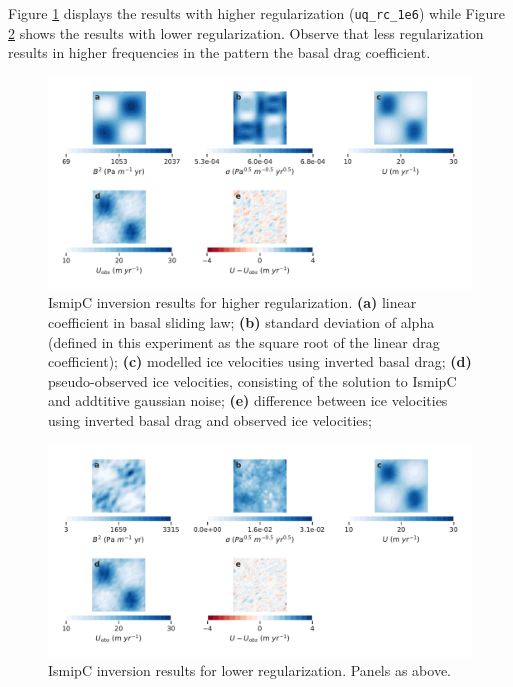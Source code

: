 \documentclass[11pt, reqno, nocenter]{article}
\begin{document}
Figure \ref{fig:inv_results_rc1e6} displays the results with higher regularization ({\tt uq\_rc\_1e6}) while Figure \ref{fig:inv_results_rc1e4} shows the results with lower regularization. Observe that less regularization results in higher frequencies in the pattern the basal drag coefficient.

\begin{figure}[!htbp]
  \centering
  \includegraphics[width=13cm]{./figures/inv_results_rc1e6.pdf}
  \caption[IsmipC Inversion Results for High Regularization.]{IsmipC inversion results for higher regularization. \textbf{(a)} linear coefficient in basal sliding law;  \textbf{(b)} standard deviation of alpha (defined in this experiment as the square root of the linear drag coefficient);   \textbf{(c)} modelled ice velocities using inverted basal drag;  \textbf{(d)} pseudo-observed ice velocities, consisting of the solution to IsmipC and addtitive gaussian noise;  \textbf{(e)} difference between ice velocities using inverted basal drag and observed ice velocities; }
      \label{fig:inv_results_rc1e6}
\end{figure}

\begin{figure}[!htbp]
  \centering
  \includegraphics[width=13cm]{./figures/inv_results_rc1e4.pdf}
  \caption[IsmipC Inversion Results for Low Regularization.]{IsmipC inversion results for lower regularization. Panels as above. }
      \label{fig:inv_results_rc1e4}
\end{figure}
\end{document}
